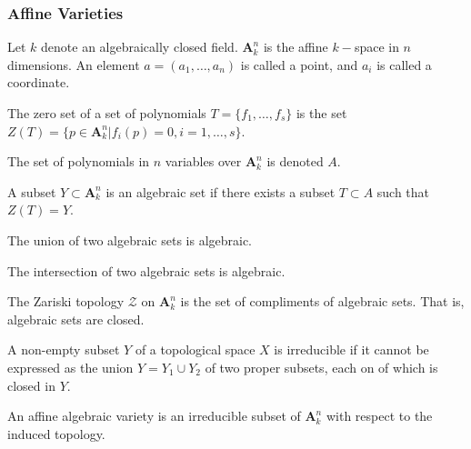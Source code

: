 \documentclass[crop=false,class=article,oneside]{standalone}
\begin{document}
        \subsubsection{Affine Varieties}
            Let $k$ denote an algebraically closed field.
            $\textbf{A}_{k}^n$ is the affine $k-$space in
            $n$ dimensions. An element $a=(a_1,\hdots, a_n)$
            is called a point, and $a_i$ is called a coordinate.
            \begin{definition}
                The zero set of a set of polynomials
                $T=\{f_{1},\hdots,f_{s}\}$ is the set
                $Z(T)%
                 =\{p\in\textbf{A}_{k}^{n}|f_{i}(p)=0,%
                    i=1,\hdots,s\}$.
            \end{definition}
            \begin{notation}
                The set of polynomials in $n$ variables
                over $\textbf{A}_{k}^{n}$ is denoted $A$.
            \end{notation}
            \begin{definition}
                A subset $Y\subset\textbf{A}_{k}^{n}$ is an
                algebraic set if there exists a subset
                $T\subset{A}$ such that $Z(T)=Y$.
            \end{definition}
            \begin{theorem}
                The union of two algebraic
                sets is algebraic.
            \end{theorem}
            \begin{theorem}
                The intersection of two algebraic
                sets is algebraic.
            \end{theorem}
            \begin{definition}
                The Zariski topology $\mathcal{Z}$ on
                $\textbf{A}_{k}^{n}$ is the set of compliments
                of algebraic sets. That is,
                algebraic sets are closed.
            \end{definition}
            \begin{definition}
                A non-empty subset $Y$ of a topological space
                $X$ is irreducible if it cannot be expressed
                as the union $Y={Y_{1}}\cup{Y_{2}}$ of
                two proper subsets, each on of which is
                closed in $Y$.
            \end{definition}
            \begin{definition}
                An affine algebraic variety is an irreducible
                subset of $\textbf{A}_{k}^{n}$ with respect
                to the induced topology.
            \end{definition}
\end{document}

